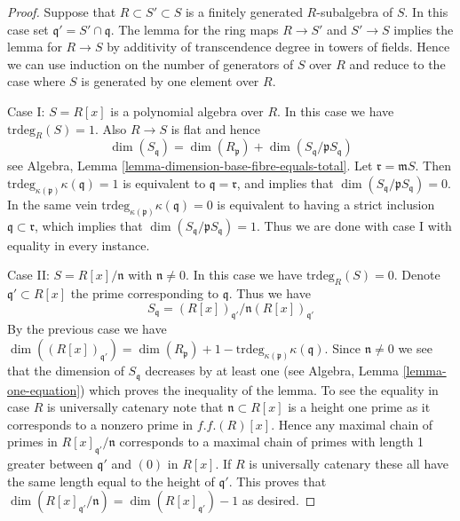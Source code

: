 \begin{proof}
Suppose that $R \subset S' \subset S$ is a finitely generated $R$-subalgebra
of $S$. In this case set $\mathfrak q' = S' \cap \mathfrak q$.
The lemma for the ring maps $R \to S'$ and $S' \to S$ implies the
lemma for $R \to S$ by additivity of transcendence degree in towers
of fields. Hence we can use induction on the number of generators
of $S$ over $R$ and reduce to the case where $S$ is generated by
one element over $R$.

\medskip\noindent
Case I: $S = R[x]$ is a polynomial algebra over $R$.
In this case we have $\text{trdeg}_{R}(S) = 1$.
Also $R \to S$ is flat and hence
$$
\dim(S_{\mathfrak q}) =
\dim(R_{\mathfrak p}) + \dim(S_{\mathfrak q}/\mathfrak pS_{\mathfrak q})
$$
see Algebra, Lemma \ref{lemma-dimension-base-fibre-equals-total}.
Let $\mathfrak r = \mathfrak mS$. Then
$\text{trdeg}_{\kappa(\mathfrak p)} \kappa(\mathfrak q) = 1$
is equivalent to $\mathfrak q = \mathfrak r$, and implies that
$\dim(S_{\mathfrak q}/\mathfrak pS_{\mathfrak q}) = 0$.
In the same vein $\text{trdeg}_{\kappa(\mathfrak p)} \kappa(\mathfrak q) = 0$
is equivalent to having a strict inclusion
$\mathfrak q \subset \mathfrak r$, which implies that
$\dim(S_{\mathfrak q}/\mathfrak pS_{\mathfrak q}) = 1$.
Thus we are done with case I with equality in every instance.

\medskip\noindent
Case II: $S = R[x]/\mathfrak n$ with $\mathfrak n \not = 0$.
In this case we have $\text{trdeg}_{R}(S) = 0$.
Denote $\mathfrak q' \subset R[x]$ the prime corresponding to $\mathfrak q$.
Thus we have
$$
S_{\mathfrak q} = (R[x])_{\mathfrak q'}/\mathfrak n(R[x])_{\mathfrak q'}
$$
By the previous case we have
$\dim((R[x])_{\mathfrak q'}) =
\dim(R_{\mathfrak p}) + 1
- \text{trdeg}_{\kappa(\mathfrak p)} \kappa(\mathfrak q)$.
Since $\mathfrak n \not = 0$ we see that the dimension of
$S_{\mathfrak q}$ decreases by at least one (see
Algebra, Lemma \ref{lemma-one-equation})
which proves the
inequality of the lemma.
To see the equality in case $R$ is universally catenary note that
$\mathfrak n \subset R[x]$ is a height one prime as it corresponds
to a nonzero prime in $f.f.(R)[x]$. Hence any maximal chain of primes
in $R[x]_{\mathfrak q'}/\mathfrak n$ corresponds to a maximal chain of primes
with length 1 greater between $\mathfrak q'$ and $(0)$ in $R[x]$.
If $R$ is universally catenary these all have the same length equal to
the height of $\mathfrak q'$. This proves that
$\dim(R[x]_{\mathfrak q'}/\mathfrak n) = \dim(R[x]_{\mathfrak q'}) - 1$
as desired.
\end{proof}










